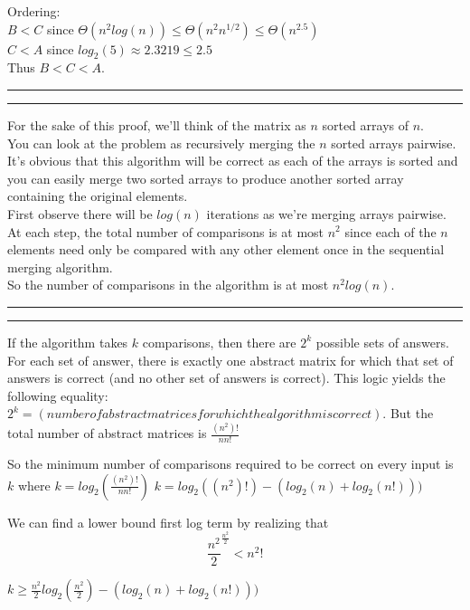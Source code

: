 \documentclass[11pt,letterpaper]{article}
\newcommand{\question}[1] {\vspace{.25in} \hrule\vspace{0.5em}
\noindent{\bf #1} \vspace{0.5em}
\hrule \vspace{.10in}}
\begin{document}
Ordering: \\
$B < C$ since $\Theta(n^{2} log(n)) \leq \Theta(n^{2} n^{1/2}) \leq \Theta(n^{2.5})$\\
$C < A$ since $log_2(5) \approx 2.3219 \leq 2.5$\\
Thus $B < C < A$.


\question{2a}
For the sake of this proof, we'll think of the matrix as $n$ sorted arrays of $n$. \\
You can look at the problem as recursively merging the $n$ sorted arrays pairwise.\\
It's obvious that this algorithm will be correct as each of the arrays is sorted and you can easily
merge two sorted arrays to produce another sorted array containing the original elements.\\
First observe there will be $log(n)$ iterations as we're merging arrays pairwise.\\
At each step, the total number of comparisons is at most $n^2$ since each of the $n$ elements need only be compared with any other element once in the sequential merging algorithm.\\
So the number of comparisons in the algorithm is at most $n^2 log(n)$.

\question{2b}
If the algorithm takes $k$ comparisons, then there are $2^k$ possible sets of answers.
For each set of answer, there is exactly one abstract matrix for which that set of answers is correct (and no other set of answers is correct).
This logic yields the following equality:
$2^k = (number of abstract matrices for which the algorithm is correct)$.
But the total number of abstract matrices is $\frac{(n^2)!}{n n!}$

So the minimum number of comparisons required to be correct on every input is $k$ where
$k = log_2(\frac{(n^2)!}{n n!})$
$k = log_2((n^2)!) - (log_2(n) + log_2(n!)))$

We can find a lower bound first log term by realizing that
$$\frac{n^2}{2}^\frac{n^2}{2} < n^2!$$

$k \geq \frac{n^2}{2} log_2(\frac{n^2}{2}) - (log_2(n) + log_2(n!)))$
\end{document}
